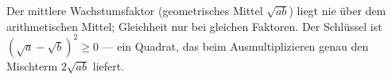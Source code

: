 \begin{merksatz}
Der mittlere Wachstumsfaktor (geometrisches Mittel $\sqrt{ab}$) liegt nie
über dem arithmetischen Mittel; Gleichheit nur bei gleichen Faktoren.
Der Schlüssel ist $( \sqrt a-\sqrt b)^2\ge0$ --- ein Quadrat, das beim
Ausmultiplizieren genau den Mischterm $2\sqrt{ab}$ liefert.
\end{merksatz}
